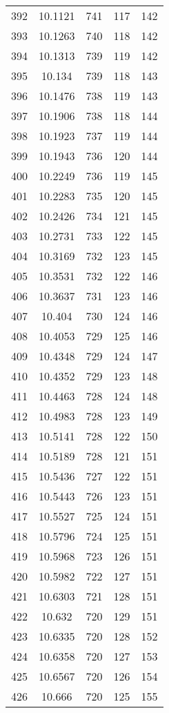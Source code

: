 \documentclass[12pt,a4paper]{article}
\begin{document}
\begin{tabular}{r|cccc}
	392 & 10.1121 & 741 & 117 & 142 \\
	393 & 10.1263 & 740 & 118 & 142 \\
	394 & 10.1313 & 739 & 119 & 142 \\
	395 & 10.134 & 739 & 118 & 143 \\
	396 & 10.1476 & 738 & 119 & 143 \\
	397 & 10.1906 & 738 & 118 & 144 \\
	398 & 10.1923 & 737 & 119 & 144 \\
	399 & 10.1943 & 736 & 120 & 144 \\
	400 & 10.2249 & 736 & 119 & 145 \\
	401 & 10.2283 & 735 & 120 & 145 \\
	402 & 10.2426 & 734 & 121 & 145 \\
	403 & 10.2731 & 733 & 122 & 145 \\
	404 & 10.3169 & 732 & 123 & 145 \\
	405 & 10.3531 & 732 & 122 & 146 \\
	406 & 10.3637 & 731 & 123 & 146 \\
	407 & 10.404 & 730 & 124 & 146 \\
	408 & 10.4053 & 729 & 125 & 146 \\
	409 & 10.4348 & 729 & 124 & 147 \\
	410 & 10.4352 & 729 & 123 & 148 \\
	411 & 10.4463 & 728 & 124 & 148 \\
	412 & 10.4983 & 728 & 123 & 149 \\
	413 & 10.5141 & 728 & 122 & 150 \\
	414 & 10.5189 & 728 & 121 & 151 \\
	415 & 10.5436 & 727 & 122 & 151 \\
	416 & 10.5443 & 726 & 123 & 151 \\
	417 & 10.5527 & 725 & 124 & 151 \\
	418 & 10.5796 & 724 & 125 & 151 \\
	419 & 10.5968 & 723 & 126 & 151 \\
	420 & 10.5982 & 722 & 127 & 151 \\
	421 & 10.6303 & 721 & 128 & 151 \\
	422 & 10.632 & 720 & 129 & 151 \\
	423 & 10.6335 & 720 & 128 & 152 \\
	424 & 10.6358 & 720 & 127 & 153 \\
	425 & 10.6567 & 720 & 126 & 154 \\
	426 & 10.666 & 720 & 125 & 155 \\

\end{tabular}
\end{document}
